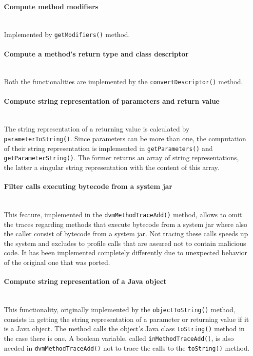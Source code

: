 \paragraph{Compute method modifiers} ~\\
Implemented by \texttt{getModifiers()} method.

\paragraph{Compute a method's return type and class descriptor} ~\\
Both the functionalities are implemented by the \texttt{convertDescriptor()} method.

\paragraph{Compute string representation of parameters and return value} ~\\
The string representation of a returning value is calculated by
\texttt{parameterToString()}. Since parameters can be more than one, the
computation of their string representation is implemented in
\texttt{getParameters()} and \texttt{getParameterString()}. The former returns an array
of string representations, the latter a singular string representation
with the content of this array.

\paragraph{Filter calls executing bytecode from a system jar} ~\\
This feature, implemented in the \texttt{dvmMethodTraceAdd()} method, allows to
omit the traces regarding methods that execute bytecode from a system
jar where also the caller consist of bytecode from a system jar. Not
tracing these calls speeds up the system and excludes to profile calls
that are assured not to contain malicious code. It has been
implemented completely differently due to unexpected behavior of the
original one that was ported.

\paragraph{Compute string representation of a Java object} ~\\
This functionality, originally implemented by the
\texttt{objectToString()} method, consists in getting the string
representation of a parameter or returning value if it is a Java
object. The method calls the object's Java class \texttt{toString()}
method in the case there is one. A boolean variable, called
\texttt{inMethodTraceAdd()}, is also needed in
\texttt{dvmMethodTraceAdd()} not to trace the calls to the
\texttt{toString()} method.

